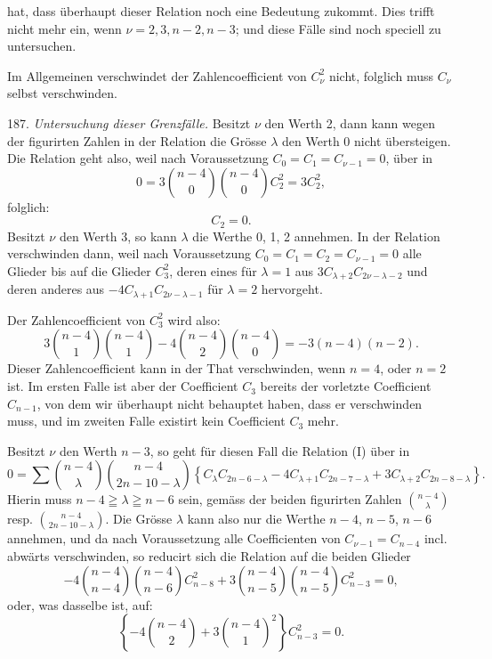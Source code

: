 hat, dass \"uberhaupt dieser Relation noch eine Bedeutung zukommt.
Dies trifft nicht mehr ein, wenn $\nu = 2, 3, n-2, n-3$; und diese
F\"alle sind noch speciell zu untersuchen.

Im Allgemeinen verschwindet der Zahlencoefficient von $C_\nu^2$
nicht, folglich muss $C_\nu$ selbst verschwinden.

187. \textit{Untersuchung dieser Grenzf\"alle.} Besitzt $\nu$ den
Werth 2, dann kann wegen der figurirten Zahlen in der Relation
die Gr\"osse $\lambda$ den Werth 0 nicht \"ubersteigen. Die Relation
geht also, weil nach Voraussetzung $C_0 = C_1 = C_{\nu-1} = 0$,
\"uber in
\[
0 = 3\binom{n-4}{0}\binom{n-4}{0}C_2^2 = 3C_2^2,
\]
folglich:
\[
C_2 = 0.
\]
Besitzt $\nu$ den Werth 3, so kann $\lambda$ die Werthe 0, 1, 2
annehmen. In der Relation verschwinden dann, weil nach Voraussetzung
$C_0 = C_1 = C_2 = C_{\nu-1} = 0$ alle Glieder bis auf die Glieder
$C_3^2$, deren eines f\"ur $\lambda = 1$ aus $3C_{\lambda+2}C_{2\nu-\lambda-2}$
und deren anderes aus $-4C_{\lambda+1}C_{2\nu-\lambda-1}$ f\"ur
$\lambda = 2$ hervorgeht.

Der Zahlencoefficient von $C_3^2$ wird also:
\[
3\binom{n-4}{1}\binom{n-4}{1} - 4\binom{n-4}{2}\binom{n-4}{0} = -3(n-4)(n-2).
\]
Dieser Zahlencoefficient kann in der That verschwinden, wenn $n = 4$,
oder $n = 2$ ist. Im ersten Falle ist aber der Coefficient $C_3$
bereits der vorletzte Coefficient $C_{n-1}$, von dem wir \"uberhaupt
nicht behauptet haben, dass er verschwinden muss, und im zweiten
Falle existirt kein Coefficient $C_3$ mehr.

Besitzt $\nu$ den Werth $n-3$, so geht f\"ur diesen Fall die Relation
(I) \"uber in
\[
0 = \sum \binom{n-4}{\lambda}\binom{n-4}{2n-10-\lambda}\left\{C_\lambda C_{2n-6-\lambda} - 4C_{\lambda+1}C_{2n-7-\lambda} + 3C_{\lambda+2}C_{2n-8-\lambda}\right\}.
\]
Hierin muss $n-4 \geqq \lambda \geqq n-6$ sein, gem\"ass der beiden
figurirten Zahlen $\binom{n-4}{\lambda}$ resp.
$\binom{n-4}{2n-10-\lambda}$. Die Gr\"osse $\lambda$ kann also nur
die Werthe $n-4$, $n-5$, $n-6$ annehmen, und da nach Voraussetzung
alle Coefficienten von $C_{\nu-1} = C_{n-4}$ incl. abw\"arts
verschwinden, so reducirt sich die Relation auf die beiden Glieder
\[
-4\binom{n-4}{n-4}\binom{n-4}{n-6}C_{n-8}^2 + 3\binom{n-4}{n-5}\binom{n-4}{n-5}C_{n-3}^2 = 0,
\]
oder, was dasselbe ist, auf:
\[
\left\{-4\binom{n-4}{2} + 3\binom{n-4}{1}^2\right\}C_{n-3}^2 = 0.
\]


